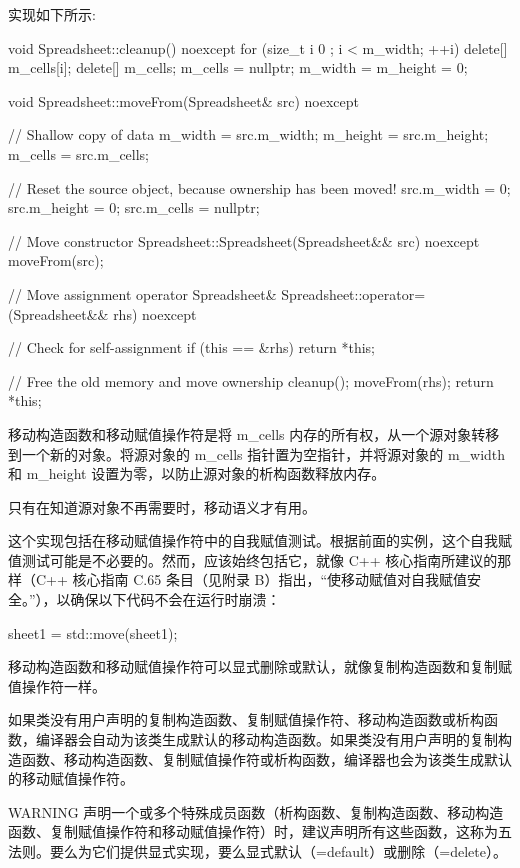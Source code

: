 实现如下所示:

\begin{cpp}
void Spreadsheet::cleanup() noexcept
{
    for (size_t i { 0 }; i < m_width; ++i) {
        delete[] m_cells[i];
    }
    delete[] m_cells;
    m_cells = nullptr;
    m_width = m_height = 0;
}

void Spreadsheet::moveFrom(Spreadsheet& src) noexcept
{
    // Shallow copy of data
    m_width = src.m_width;
    m_height = src.m_height;
    m_cells = src.m_cells;

    // Reset the source object, because ownership has been moved!
    src.m_width = 0;
    src.m_height = 0;
    src.m_cells = nullptr;
}

// Move constructor
Spreadsheet::Spreadsheet(Spreadsheet&& src) noexcept
{
    moveFrom(src);
}

// Move assignment operator
Spreadsheet& Spreadsheet::operator=(Spreadsheet&& rhs) noexcept
{
    // Check for self-assignment
    if (this == &rhs) {
        return *this;
    }

    // Free the old memory and move ownership
    cleanup();
    moveFrom(rhs);
    return *this;
}
\end{cpp}

移动构造函数和移动赋值操作符是将 m\_cells 内存的所有权，从一个源对象转移到一个新的对象。将源对象的 m\_cells 指针置为空指针，并将源对象的 m\_width 和 m\_height 设置为零，以防止源对象的析构函数释放内存。

只有在知道源对象不再需要时，移动语义才有用。

这个实现包括在移动赋值操作符中的自我赋值测试。根据前面的实例，这个自我赋值测试可能是不必要的。然而，应该始终包括它，就像 C++ 核心指南所建议的那样（C++ 核心指南 C.65 条目（见附录 B）指出，“使移动赋值对自我赋值安全。”），以确保以下代码不会在运行时崩溃：

\begin{cpp}
sheet1 = std::move(sheet1);
\end{cpp}

移动构造函数和移动赋值操作符可以显式删除或默认，就像复制构造函数和复制赋值操作符一样。

如果类没有用户声明的复制构造函数、复制赋值操作符、移动构造函数或析构函数，编译器会自动为该类生成默认的移动构造函数。如果类没有用户声明的复制构造函数、移动构造函数、复制赋值操作符或析构函数，编译器也会为该类生成默认的移动赋值操作符。

\begin{myWarning}{WARNING}
声明一个或多个特殊成员函数（析构函数、复制构造函数、移动构造函数、复制赋值操作符和移动赋值操作符）时，建议声明所有这些函数，这称为五法则。要么为它们提供显式实现，要么显式默认（=default）或删除（=delete）。
\end{myWarning}

